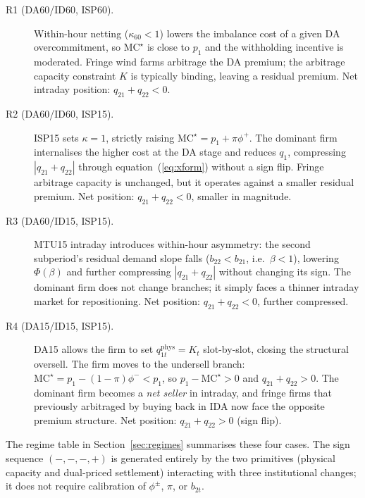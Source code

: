 \documentclass[11pt,a4paper]{article}
\begin{document}
\begin{description}
\item[R1 (DA60/ID60, ISP60).]
  Within-hour netting ($\kappa_{60}<1$) lowers the imbalance cost of a given DA
  overcommitment, so $\mathrm{MC}^\star$ is close to $p_1$ and the withholding
  incentive is moderated. Fringe wind farms arbitrage the DA premium; the
  arbitrage capacity constraint $K$ is typically binding, leaving a residual
  premium. Net intraday position: $q_{21}+q_{22}<0$.

\item[R2 (DA60/ID60, ISP15).]
  ISP15 sets $\kappa=1$, strictly raising $\mathrm{MC}^\star = p_1+\pi\phi^+$.
  The dominant firm internalises the higher cost at the DA stage and reduces $q_1$,
  compressing $|q_{21}+q_{22}|$ through equation~(\ref{eq:xform}) without a sign
  flip. Fringe arbitrage capacity is unchanged, but it operates against a smaller
  residual premium. Net position: $q_{21}+q_{22}<0$, smaller in magnitude.

\item[R3 (DA60/ID15, ISP15).]
  MTU15 intraday introduces within-hour asymmetry: the second subperiod's residual
  demand slope falls ($b_{22} < b_{21}$, i.e.\ $\beta < 1$), lowering $\Phi(\beta)$
  and further compressing $|q_{21}+q_{22}|$ without changing its sign. The
  dominant firm does not change branches; it simply faces a thinner intraday market
  for repositioning. Net position: $q_{21}+q_{22}<0$, further compressed.

\item[R4 (DA15/ID15, ISP15).]
  DA15 allows the firm to set $q_{1t}^{\mathrm{phys}} = K_t$ slot-by-slot, closing
  the structural oversell. The firm moves to the undersell branch:
  $\mathrm{MC}^\star = p_1-(1-\pi)\phi^- < p_1$, so $p_1-\mathrm{MC}^\star > 0$
  and $q_{21}+q_{22}>0$. The dominant firm becomes a \emph{net seller} in intraday,
  and fringe firms that previously arbitraged by buying back in IDA now face the
  opposite premium structure. Net position: $q_{21}+q_{22}>0$ (sign flip).
\end{description}

The regime table in Section~\ref{sec:regimes} summarises these four cases. The
sign sequence $(-,-,-,+)$ is generated entirely by the two primitives (physical
capacity and dual-priced settlement) interacting with three institutional
changes; it does not require calibration of $\phi^\pm$, $\pi$, or $b_{2t}$.
\end{document}
